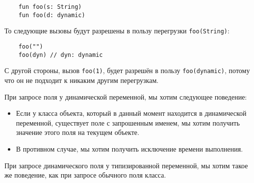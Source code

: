 \begin{verbatim}
    fun foo(s: String)
    fun foo(d: dynamic)
\end{verbatim} 

То следующие вызовы будут разрешены в пользу перегрузки \texttt{foo(String)}:

\begin{verbatim}
    foo("")
    foo(dyn) // dyn: dynamic
\end{verbatim} 

С другой стороны, вызов \texttt{foo(1)}, будет разрешён в пользу \texttt{foo(dynamic)}, потому что он не подходит к никаким другим перегрузкам.

При запросе поля у динамической переменной, мы хотим следующее поведение:

\begin{itemize}
    \item Если у класса объекта, который в данный момент находится в динамической переменной, существует поле с запрошенным именем, мы хотим получить значение этого поля на текущем объекте.
    \item В противном случае, мы хотим получить исключение времени выполнения.
\end{itemize}

При запросе динамического поля у типизированной переменной, мы хотим такое же поведение, как при запросе обычного поля класса.